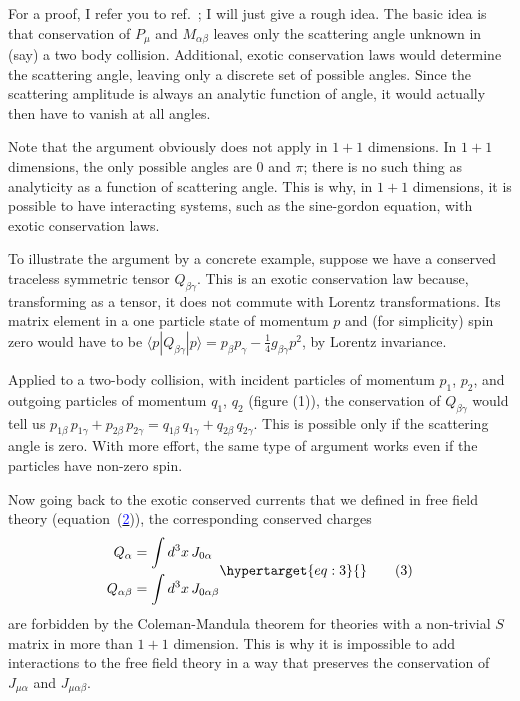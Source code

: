\documentclass[11pt,a4paper]{article}
\newcommand{\eqtarget}[1]{\hypertarget{eq:#1}{\mathstrut}\tag{#1}}
\newcommand{\eqnref}[1]{(\hyperlink{eq:#1}{\textcolor{blue}{#1}})}
\begin{document}
For a proof, I refer you to ref.~\cite{ref3}; I will just give a
rough idea. The basic idea is that conservation of $P_\mu$ and $M_{\alpha\beta}$
leaves only the scattering angle unknown in (say) a two body
collision. Additional, exotic conservation laws would determine the
scattering angle, leaving only a discrete set of possible angles.
Since the scattering amplitude is always an analytic function of
angle, it would actually then have to vanish at all angles.

Note that the argument obviously does not apply in $1+1$
dimensions. In $1+1$ dimensions, the only possible angles are $0$ and $\pi$;
there is no such thing as analyticity as a function of scattering
angle. This is why, in $1+1$ dimensions, it is possible to have
interacting systems, such as the sine-gordon equation, with exotic
conservation laws.

To illustrate the argument by a concrete example, suppose we
have a conserved traceless symmetric tensor $Q_{\beta\gamma}$. This is an exotic
conservation law because, transforming as a tensor, it does not
commute with Lorentz transformations. Its matrix element in a one
particle state of momentum $p$ and (for simplicity) spin zero would
have to be $\langle p| Q_{\beta\gamma} |p\rangle = p_\beta p_\gamma - \frac{1}{4}g_{\beta\gamma} p^2$, by Lorentz invariance.

Applied to a two-body collision, with incident particles of momentum
$p_1$, $p_2$, and outgoing particles of momentum $q_1$, $q_2$ (figure (1)), the
conservation of $Q_{\beta\gamma}$ would tell us $p_{1\beta}\, p_{1\gamma} + p_{2\beta}\, p_{2\gamma} = q_{1\beta}\, q_{1\gamma} +
q_{2\beta}\, q_{2\gamma}$.\begingroup\renewcommand{\thefootnote}{\fnsymbol{footnote}}\footnotemark[1]\endgroup 
This is possible only if the scattering angle is zero.
With more effort, the same type of argument works even if the
particles have non-zero spin.

Now going back to the exotic conserved currents that we defined
in free field theory (equation~\eqnref{2}), the corresponding conserved
charges
\begin{equation}
\begin{aligned}
Q_\alpha &= \int d^3x\, J_{0\alpha} \\
Q_{\alpha\beta} &= \int d^3x\, J_{0\alpha\beta}
\end{aligned}
\eqtarget{3}
\end{equation}
are forbidden by the Coleman-Mandula theorem for theories with a
non-trivial $S$ matrix in more than $1+1$ dimension. This is why it is
impossible to add interactions to
the free field theory in a way that
preserves the conservation of $J_{\mu\alpha}$
and $J_{\mu\alpha\beta}$.
\end{document}
